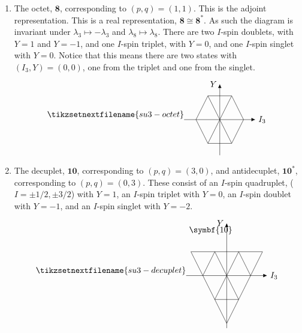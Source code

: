 \documentclass[fleqn]{NotesClass}
\newcommand{\isomorphic}{\cong}
\newcommand{\rep}[1]{\symbf{#1}}
\begin{document}
\begin{enumerate}
        \item The octet, \(\rep{8}\), corresponding to \((p, q) = (1, 1)\).
        This is the adjoint representation.
        This is a real representation, \(\rep{8} \isomorphic \rep{8}^*\).
        As such the diagram is invariant under \(\lambda_3 \mapsto -\lambda_3\) and \(\lambda_8 \mapsto \lambda_8\).
        There are two \(I\)-spin doublets, with \(Y = 1\) and \(Y = -1\), and one \(I\)-spin triplet, with \(Y = 0\), and one \(I\)-spin singlet with \(Y = 0\).
        Notice that this means there are two states with \((I_3, Y) = (0, 0)\), one from the triplet and one from the singlet.
        \begin{equation}
            \tikzsetnextfilename{su3-octet}
            \begin{tikzpicture}[
                >={Latex[width=1.5mm]},
                baseline = (current bounding box)
                ]
                \draw (1/2, 1) -- (1, 0) -- (1/2, -1) -- (-1/2, -1) -- (-1, 0) -- (-1/2, 1) -- cycle;
                \draw (1/2, 1) -- (-1/2, -1);
                \draw (-1/2, 1) -- (1/2, -1);
                \draw[->] (-1.5, 0) -- (1.5, 0) node [right] {\(I_3\)};
                \draw[->] (0, -1.5) -- (0, 1.5) node [left] {\(Y\)};
            \end{tikzpicture}
        \end{equation}
        \item The decuplet, \(\rep{10}\), corresponding to \((p, q) = (3, 0)\), and antidecuplet, \(\rep{10}^*\), corresponding to \((p, q) = (0, 3)\).
        These consist of an \(I\)-spin quadruplet, (\(I = \pm 1/2, \pm 3/2\)) with \(Y = 1\), an \(I\)-spin triplet with \(Y = 0\), an \(I\)-spin doublet with \(Y = -1\), and an \(I\)-spin singlet with \(Y = -2\).
        \begin{equation}
            \tikzsetnextfilename{su3-decuplet}
            \begin{tikzpicture}[
                >={Latex[width=1.5mm]},
                baseline = (current bounding box)
                ]
                \node[below right] at (-1.7, 2.2) {\(\rep{10}\)};
                \draw (-3/2, 1) -- (3/2, 1) -- (0, -2) -- cycle;
                \draw (-1, 0) -- (-1/2, 1) -- (0, 0) -- (1/2, 1) -- (1, 0);
                \draw (-1/2, -1) -- (0, 0) -- (1/2, -1) -- cycle;
                \draw[->] (-1.7, 0) -- (1.7, 0) node [right] {\(I_3\)};
                \draw[->] (0, -2.2) -- (0, 2.2) node [left] {\(Y\)};
                

\end{tikzpicture}
\end{equation}
\end{enumerate}
\end{document}
